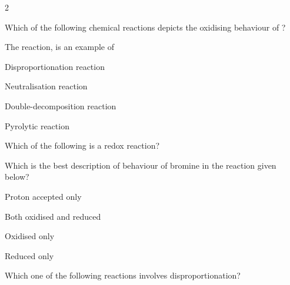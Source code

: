 \documentclass[10pt,a4paper]{article}
\begin{document}
\begin{multicols}{2}
\begin{questions}
\item Which of the following chemical reactions depicts the oxidising behaviour of ?
\begin{options}
  \item {}
  \item {}
  \item {}
  \item {}
\end{options}

\item The reaction,  is an example of
\begin{options}
  \item Disproportionation reaction
  \item Neutralisation reaction
  \item Double-decomposition reaction
  \item Pyrolytic reaction
\end{options}

\item Which of the following is a redox reaction?
\begin{options}
  \item {}
  \item {}
  \item {}
  \item {}
\end{options}

\item Which is the best description of behaviour of bromine in the reaction given below?\\
\begin{options}
  \item Proton accepted only
  \item Both oxidised and reduced
  \item Oxidised only
  \item Reduced only
\end{options}

\item Which one of the following reactions involves disproportionation?
\begin{options}
  \item {}
  \item {}
  \item {}
  \item {}
\end{options}


\end{questions}
\end{multicols}
\end{document}

